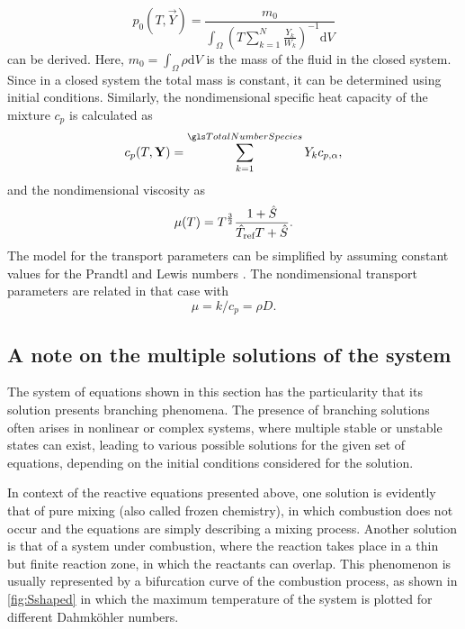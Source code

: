 \begin{equation}
	p_0(T, \vec{Y}) = \frac{m_0}{\int_\Omega \left( T\sum_{k=1}^{N} \frac{Y_k}{W_k} \right)^{-1}\text{d}V} \label{eq:p0Condition}
\end{equation}
can be derived. Here, $m_0 = \int_\Omega \rho \text{d}V$ is the mass of the fluid in the closed system. Since in a closed system the total mass is constant, it can be determined using initial conditions.
Similarly, the nondimensional specific heat capacity of the mixture $c_p$ is calculated as
\begin{equation}\label{eq:nondim_cpmixture}
	c_p(T,\mathbf{Y}) = \SumOvAllns Y_k c_{p,\alpha},
\end{equation}
and the nondimensional viscosity as
\begin{equation} \label{eq:nondim_sutherland}
	\mu(T) =  T^{\frac{3}{2}}\frac{1+\hat{S} }{\hat T_{\text{ref}}T+\hat{S}}.
\end{equation}
The model for the transport parameters can be simplified by assuming constant values for the Prandtl and Lewis numbers \parencite{smokeFormulationPremixedNonpremixed1991}.  The nondimensional transport parameters are related in that case with 
\begin{equation}
    \mu = k/c_p = \rho D.
\end{equation}
\subsection{A note on the multiple solutions of the system}
The system of equations shown in this section has the particularity that its solution presents branching phenomena. The presence of branching solutions often arises in nonlinear or complex systems, where multiple stable or unstable states can exist, leading to various possible solutions for the given set of equations, depending on the initial conditions considered for the solution.

In context of the reactive equations presented above, one solution is evidently that of pure mixing (also called frozen chemistry), in which combustion does not occur and the equations are simply describing a mixing process. Another solution is that of a system under combustion, where the reaction takes place in a thin but finite reaction zone, in which the reactants can overlap. This phenomenon is usually represented by a bifurcation curve of the combustion process, as shown in \cref{fig:Sshaped} in which the maximum temperature of the system is plotted for different Dahmköhler numbers. 

